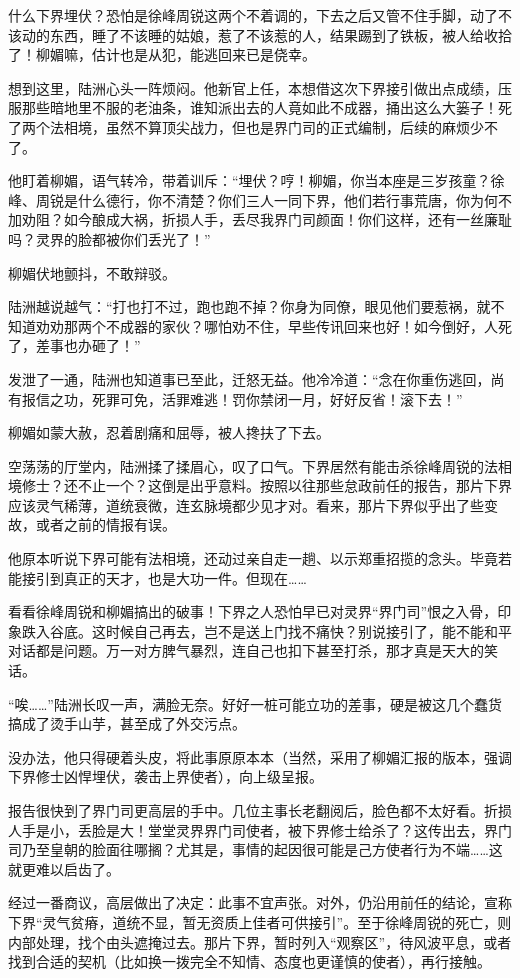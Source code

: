 什么下界埋伏？恐怕是徐峰周锐这两个不着调的，下去之后又管不住手脚，动了不该动的东西，睡了不该睡的姑娘，惹了不该惹的人，结果踢到了铁板，被人给收拾了！柳媚嘛，估计也是从犯，能逃回来已是侥幸。

想到这里，陆洲心头一阵烦闷。他新官上任，本想借这次下界接引做出点成绩，压服那些暗地里不服的老油条，谁知派出去的人竟如此不成器，捅出这么大篓子！死了两个法相境，虽然不算顶尖战力，但也是界门司的正式编制，后续的麻烦少不了。

他盯着柳媚，语气转冷，带着训斥：“埋伏？哼！柳媚，你当本座是三岁孩童？徐峰、周锐是什么德行，你不清楚？你们三人一同下界，他们若行事荒唐，你为何不加劝阻？如今酿成大祸，折损人手，丢尽我界门司颜面！你们这样，还有一丝廉耻吗？灵界的脸都被你们丢光了！”

柳媚伏地颤抖，不敢辩驳。

陆洲越说越气：“打也打不过，跑也跑不掉？你身为同僚，眼见他们要惹祸，就不知道劝劝那两个不成器的家伙？哪怕劝不住，早些传讯回来也好！如今倒好，人死了，差事也办砸了！”

发泄了一通，陆洲也知道事已至此，迁怒无益。他冷冷道：“念在你重伤逃回，尚有报信之功，死罪可免，活罪难逃！罚你禁闭一月，好好反省！滚下去！”

柳媚如蒙大赦，忍着剧痛和屈辱，被人搀扶了下去。

空荡荡的厅堂内，陆洲揉了揉眉心，叹了口气。下界居然有能击杀徐峰周锐的法相境修士？还不止一个？这倒是出乎意料。按照以往那些怠政前任的报告，那片下界应该灵气稀薄，道统衰微，连玄脉境都少见才对。看来，那片下界似乎出了些变故，或者之前的情报有误。

他原本听说下界可能有法相境，还动过亲自走一趟、以示郑重招揽的念头。毕竟若能接引到真正的天才，也是大功一件。但现在……

看看徐峰周锐和柳媚搞出的破事！下界之人恐怕早已对灵界“界门司”恨之入骨，印象跌入谷底。这时候自己再去，岂不是送上门找不痛快？别说接引了，能不能和平对话都是问题。万一对方脾气暴烈，连自己也扣下甚至打杀，那才真是天大的笑话。

“唉……”陆洲长叹一声，满脸无奈。好好一桩可能立功的差事，硬是被这几个蠢货搞成了烫手山芋，甚至成了外交污点。

没办法，他只得硬着头皮，将此事原原本本（当然，采用了柳媚汇报的版本，强调下界修士凶悍埋伏，袭击上界使者），向上级呈报。

报告很快到了界门司更高层的手中。几位主事长老翻阅后，脸色都不太好看。折损人手是小，丢脸是大！堂堂灵界界门司使者，被下界修士给杀了？这传出去，界门司乃至皇朝的脸面往哪搁？尤其是，事情的起因很可能是己方使者行为不端……这就更难以启齿了。

经过一番商议，高层做出了决定：此事不宜声张。对外，仍沿用前任的结论，宣称下界“灵气贫瘠，道统不显，暂无资质上佳者可供接引”。至于徐峰周锐的死亡，则内部处理，找个由头遮掩过去。那片下界，暂时列入“观察区”，待风波平息，或者找到合适的契机（比如换一拨完全不知情、态度也更谨慎的使者），再行接触。

